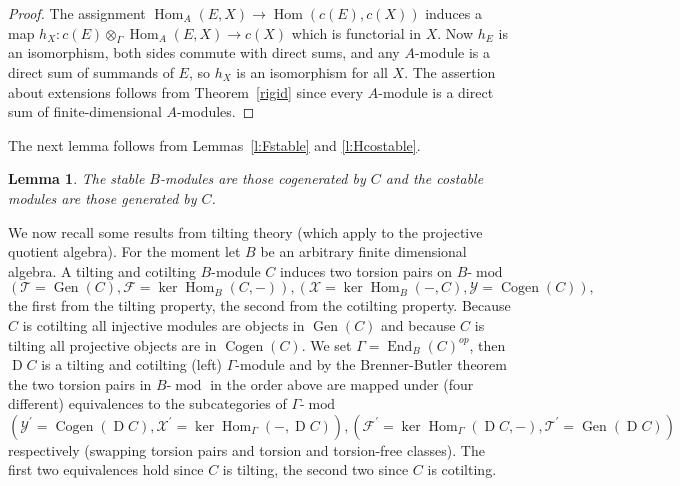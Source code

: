 \documentclass[11pt,a4paper]{amsart}
\theoremstyle{plain}
\newtheorem{lem}[thm]{Lemma}
\theoremstyle{definition}
\begin{document}
\begin{proof}
The assignment $\operatorname{Hom}_A(E,X)\to \operatorname{Hom}(c(E),c(X))$ induces a map
$h_X:c(E)\otimes_\Gamma \operatorname{Hom}_A(E,X)\to c(X)$ which is functorial in $X$. Now $h_E$ is an
isomorphism, both sides commute with direct sums, and any $A$-module is
a direct sum of summands of $E$, so $h_X$ is an isomorphism for all $X$.
The assertion about extensions follows from Theorem~\ref{rigid} since every
$A$-module is a direct sum of finite-dimensional $A$-modules.
\end{proof}

The next lemma follows from Lemmas~\ref{l:Fstable} and \ref{l:Hcostable}.

\begin{lem}  
The stable $B$-modules are those cogenerated by $C$ and the
costable modules are those generated by $C$. 
\end{lem}

We now recall some results from tilting theory (which apply to the projective quotient algebra). 
For the moment let $B$ be an arbitrary finite dimensional algebra.  A tilting and cotilting $B$-module $C$ induces two torsion pairs on $B$-$\operatorname{mod}$ 
\[ 
\left({\mathcal{T}}=\operatorname{Gen} (C), {\mathcal{F}}= \operatorname{ker} \operatorname{Hom}_B(C,-)\right), \left({\mathcal{X}}= \operatorname{ker} \operatorname{Hom}_B(-,C) , {\mathcal{Y}}=\operatorname{Cogen} (C)\right),   
\]
the first from the tilting property, the second from the cotilting property. Because $C$ is cotilting all  injective modules are objects in $\operatorname{Gen} (C)$ and because $C$ is tilting all projective objects are in $\operatorname{Cogen} (C)$. We set $\Gamma = \operatorname{End}_B (C)^{op}$, then $\operatorname{D} C$ is a tilting and cotilting (left) $\Gamma $-module
and by the Brenner-Butler theorem the two torsion pairs in $B$-$\operatorname{mod}$ in the order above are mapped under (four different) equivalences to the subcategories of $\Gamma$-$\operatorname{mod} $
\[ 
 \left( {\mathcal{Y}}^\prime =\operatorname{Cogen} (\operatorname{D} C), {\mathcal{X}}^\prime =\operatorname{ker} \operatorname{Hom}_{\Gamma} (-, \operatorname{D} C)\right)  ,\left( {\mathcal{F}}^\prime = \operatorname{ker} \operatorname{Hom}_{\Gamma} ( \operatorname{D} C,-), {\mathcal{T}}^\prime =\operatorname{Gen} (\operatorname{D} C)\right) 
\]   
respectively (swapping torsion pairs and torsion and torsion-free classes).  
The first two equivalences hold since $C$ is tilting, the second two since $C$ is cotilting. 
\end{document}
